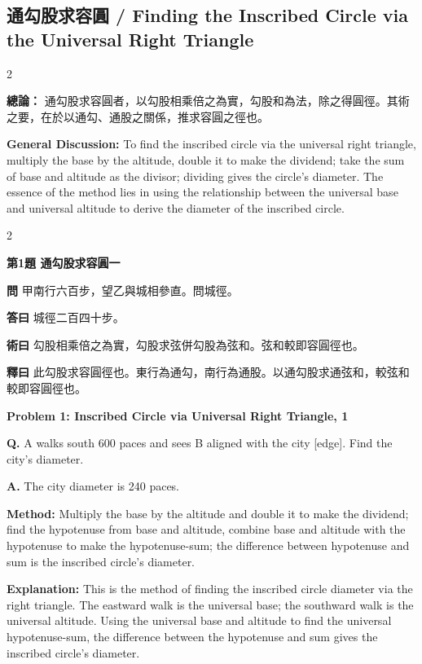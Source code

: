 \documentclass[11pt,a4paper]{article}
\newcommand{\wen}[1]{\noindent\textbf{問} #1\par\smallskip}
\newcommand{\da}[1]{\noindent\textbf{答曰} #1\par\smallskip}
\newcommand{\shu}[1]{\noindent\textbf{術曰} #1\par\smallskip}
\newcommand{\shi}[1]{\noindent\textbf{釋曰} #1\par\smallskip}
\newcommand{\wenE}[1]{\noindent\textbf{Q.} #1\par\smallskip}
\newcommand{\daE}[1]{\noindent\textbf{A.} #1\par\smallskip}
\newcommand{\shuE}[1]{\noindent\textbf{Method:} #1\par\smallskip}
\newcommand{\shiE}[1]{\noindent\textbf{Explanation:} #1\par\smallskip}
\begin{document}
\bigskip

\subsection*{通勾股求容圓 / Finding the Inscribed Circle via the Universal Right Triangle}

\begin{paracol}{2}

\noindent\textbf{總論：} 通勾股求容圓者，以勾股相乘倍之為實，勾股和為法，除之得圓徑。其術之要，在於以通勾、通股之關係，推求容圓之徑也。

\switchcolumn

\noindent\textbf{General Discussion:} To find the inscribed circle via the universal right triangle, multiply the base by the altitude, double it to make the dividend; take the sum of base and altitude as the divisor; dividing gives the circle's diameter. The essence of the method lies in using the relationship between the universal base and universal altitude to derive the diameter of the inscribed circle.

\end{paracol}

\bigskip

\begin{paracol}{2}

\noindent\textbf{第1題 通勾股求容圓一}

\wen{甲南行六百步，望乙與城相參直。問城徑。}
\da{城徑二百四十步。}
\shu{勾股相乘倍之為實，勾股求弦併勾股為弦和。弦和較即容圓徑也。}
\shi{此勾股求容圓徑也。東行為通勾，南行為通股。以通勾股求通弦和，較弦和較即容圓徑也。}

\switchcolumn

\noindent\textbf{Problem 1: Inscribed Circle via Universal Right Triangle, 1}

\wenE{A walks south 600 paces and sees B aligned with the city [edge]. Find the city's diameter.}
\daE{The city diameter is 240 paces.}
\shuE{Multiply the base by the altitude and double it to make the dividend; find the hypotenuse from base and altitude, combine base and altitude with the hypotenuse to make the hypotenuse-sum; the difference between hypotenuse and sum is the inscribed circle's diameter.}
\shiE{This is the method of finding the inscribed circle diameter via the right triangle. The eastward walk is the universal base; the southward walk is the universal altitude. Using the universal base and altitude to find the universal hypotenuse-sum, the difference between the hypotenuse and sum gives the inscribed circle's diameter.}

\end{paracol}
\end{document}
